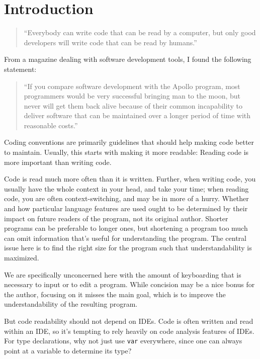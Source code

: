 \chapter{Introduction}

\begin{quotation}
“Everybody can write code that can be read by a computer,
but only good developers will write code that can be read by humans.”
\autocite{Fowler:Refactoring}
\end{quotation}

From a magazine dealing with software development tools, I found the following statement:

\begin{quotation}
“If you compare software development with the Apollo program, most programmers would be very successful bringing man to the moon, but never will get them back alive because of their common incapability to deliver software that can be maintained over a longer period of time with reasonable costs.”
\end{quotation}

Coding conventions are primarily guidelines that should help making code better to maintain. Usually, this starts with making it more readable: Reading code is more important than writing code.

Code is read much more often than it is written. Further, when writing code, you usually have the whole context in your head, and take your time; when reading code, you are often context-switching, and may be in more of a hurry. Whether and how particular language features are used ought to be determined by their impact on future readers of the program, not its original author. Shorter programs can be preferable to longer ones, but shortening a program too much can omit information that’s useful for understanding the program. The central issue here is to find the right size for the program such that understandability is maximized.

We are specifically unconcerned here with the amount of keyboarding that is necessary to input or to edit a program. While concision may be a nice bonus for the author, focusing on it misses the main goal, which is to improve the understandability of the resulting program.

But code readability should not depend on IDEs. Code is often written and read within an IDE, so it’s tempting to rely heavily on code analysis features of IDEs. For type declarations, why not just use \lstinline|var| everywhere, since one can always point at a variable to determine its type?

